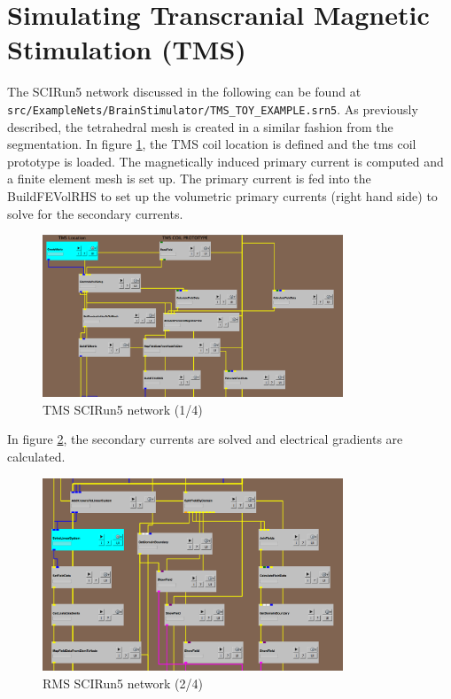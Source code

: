 \documentclass[fleqn,11pt,openany]{book}
\begin{document}
\section{Simulating Transcranial Magnetic Stimulation (TMS)}\label{sec:sim_tms}
The SCIRun5 network discussed in the following can be found at \texttt{src/ExampleNets/BrainStimulator/TMS\_TOY\_EXAMPLE.srn5}.
As previously described, the tetrahedral mesh is created in a similar fashion from the segmentation.
In figure \ref{fig:tms1}, the TMS coil location is defined and the tms coil prototype is loaded. The magnetically induced primary current
is computed and a finite element mesh is set up. The primary current is fed into the BuildFEVolRHS to set up the volumetric primary currents (right hand side)
to solve for the secondary currents.

 \begin{figure}[!h]
\centering
\includegraphics[width=0.8\textwidth]{BrainStimulation_figures/tms1.png}
\caption{ TMS SCIRun5 network (1/4)}
\label{fig:tms1}
\end{figure}

In figure \ref{fig:tms2}, the secondary currents are solved and electrical gradients are calculated.

 \begin{figure}[!h]
\centering
\includegraphics[width=0.8\textwidth]{BrainStimulation_figures/tms2.png}
\caption{ RMS SCIRun5 network (2/4)}
\label{fig:tms2}
\end{figure}
\end{document}
